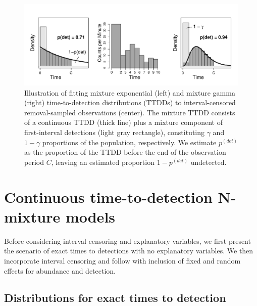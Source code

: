 \documentclass[12pt]{article}
\newcommand{\pdet}{p^{(det)}}
\begin{document}
\begin{figure}\centering
\includegraphics[width=\textwidth]{"Oral Prelim/AMRO_JABES"}
\caption{\label{fig:schematic} 
Illustration of fitting mixture exponential (left) and mixture gamma (right) time-to-detection distributions (TTDDs) to interval-censored removal-sampled observations (center).
The mixture TTDD consists of a continuous TTDD (thick line) plus a mixture component of first-interval detections (light gray rectangle), constituting $\gamma$ and $1-\gamma$ proportions of the population, respectively.
We estimate $\pdet$ as the proportion of the TTDD before the end of the observation period $C$, leaving an estimated proportion $1-\pdet$ undetected.
}
\end{figure}




\section{Continuous time-to-detection N-mixture models} \label{sec:model}

Before considering interval censoring and explanatory variables, we first present the scenario of exact times to detections with no explanatory variables. 
We then incorporate interval censoring and follow with inclusion of fixed and random effects for abundance and detection. 

\subsection{Distributions for exact times to detection}\label{sec:exact_time}
\end{document}
